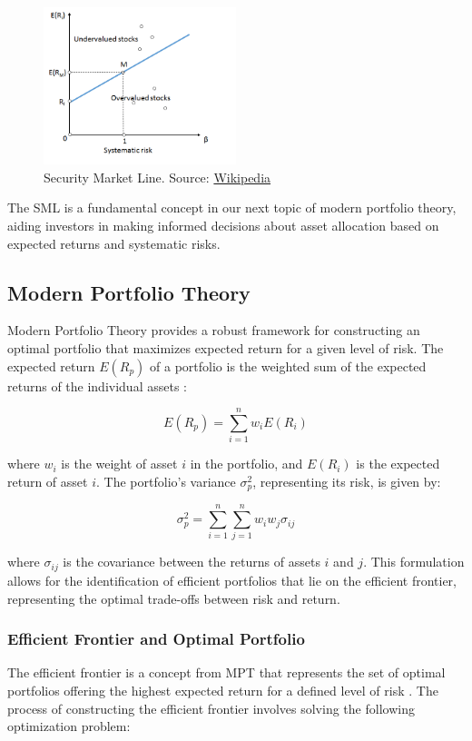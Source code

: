 \begin{figure}[h]
\centering
\includegraphics[width=0.5\textwidth]{SML.png} 
\caption{Security Market Line. Source: \href{https://en.wikipedia.org/wiki/Security_market_line}{Wikipedia}}
\label{fig:sml}
\end{figure}

The SML is a fundamental concept in our next topic of modern portfolio theory, aiding investors in making informed decisions about asset allocation based on expected returns and systematic risks.

\subsection{Modern Portfolio Theory}
Modern Portfolio Theory provides a robust framework for constructing an optimal portfolio that maximizes expected return for a given level of risk. The expected return \( E(R_p) \) of a portfolio is the weighted sum of the expected returns of the individual assets \citep{markowitz1952portfolio}:

\[
E(R_p) = \sum_{i=1}^{n} w_i E(R_i)
\]

where \( w_i \) is the weight of asset \( i \) in the portfolio, and \( E(R_i) \) is the expected return of asset \( i \). The portfolio’s variance \( \sigma^2_p \), representing its risk, is given by:

\[
\sigma^2_p = \sum_{i=1}^{n} \sum_{j=1}^{n} w_i w_j \sigma_{ij}
\]

where \( \sigma_{ij} \) is the covariance between the returns of assets \( i \) and \( j \). This formulation allows for the identification of efficient portfolios that lie on the efficient frontier, representing the optimal trade-offs between risk and return.

\subsubsection{Efficient Frontier and Optimal Portfolio}
The efficient frontier is a concept from MPT that represents the set of optimal portfolios offering the highest expected return for a defined level of risk \citep{markowitz1952portfolio}. The process of constructing the efficient frontier involves solving the following optimization problem:

